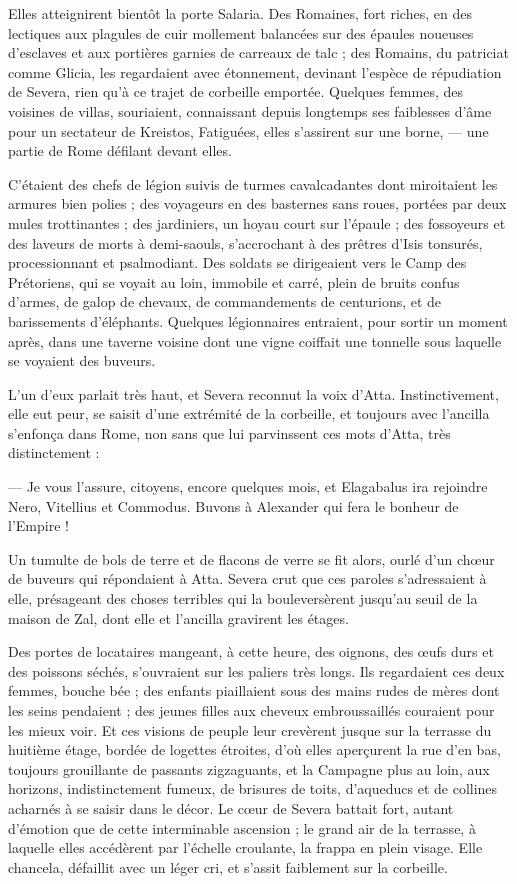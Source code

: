 \documentclass[a4paper, 11pt, oneside, polutonikogreek, french]{article}
\begin{document}
Elles atteignirent bientôt la porte Salaria. Des Romaines, fort riches, en des lectiques aux plagules de cuir mollement balancées sur des épaules noueuses d'esclaves et aux portières garnies de carreaux de talc ; des Romains, du patriciat comme Glicia, les regardaient avec étonnement, devinant l'espèce de répudiation de Severa, rien qu'à ce trajet de corbeille emportée. Quelques femmes, des voisines de villas, souriaient, connaissant depuis longtemps ses faiblesses d'âme pour un sectateur de Kreistos, Fatiguées, elles s'assirent sur une borne, --- une partie de Rome défilant devant elles.

C'étaient des chefs de légion suivis de turmes cavalcadantes dont miroitaient les armures bien polies ; des voyageurs en des basternes sans roues, portées par deux mules trottinantes ; des jardiniers, un hoyau court sur l'épaule ; des fossoyeurs et des laveurs de morts à demi-saouls, s'accrochant à des prêtres d'Isis tonsurés, processionnant et psalmodiant. Des soldats se dirigeaient vers le Camp des Prétoriens, qui se voyait au loin, immobile et carré, plein de bruits confus d'armes, de galop de chevaux, de commandements de centurions, et de barissements d'éléphants. Quelques légionnaires entraient, pour sortir un moment après, dans une taverne voisine dont une vigne coiffait une tonnelle sous laquelle se voyaient des buveurs.

L'un d'eux parlait très haut, et Severa reconnut la voix d'Atta. Instinctivement, elle eut peur, se saisit d'une extrémité de la corbeille, et toujours avec l'ancilla s'enfonça dans Rome, non sans que lui parvinssent ces mots d'Atta, très distinctement :

--- Je vous l'assure, citoyens, encore quelques mois, et Elagabalus ira rejoindre Nero, Vitellius et Commodus. Buvons à Alexander qui fera le bonheur de l'Empire !

Un tumulte de bols de terre et de flacons de verre se fit alors, ourlé d'un chœur de buveurs qui répondaient à Atta. Severa crut que ces paroles s'adressaient à elle, présageant des choses terribles qui la bouleversèrent jusqu'au seuil de la maison de Zal, dont elle et l'ancilla gravirent les étages.

Des portes de locataires mangeant, à cette heure, des oignons, des œufs durs et des poissons séchés, s'ouvraient sur les paliers très longs. Ils regardaient ces deux femmes, bouche bée ; des enfants piaillaient sous des mains rudes de mères dont les seins pendaient ; des jeunes filles aux cheveux embroussaillés couraient pour les mieux voir. Et ces visions de peuple leur crevèrent jusque sur la terrasse du huitième étage, bordée de logettes étroites, d'où elles aperçurent la rue d'en bas, toujours grouillante de passants zigzaguants, et la Campagne plus au loin, aux horizons, indistinctement fumeux, de brisures de toits, d'aqueducs et de collines acharnés à se saisir dans le décor. Le cœur de Severa battait fort, autant d'émotion que de cette interminable ascension ; le grand air de la terrasse, à laquelle elles accédèrent par l'échelle croulante, la frappa en plein visage. Elle chancela, défaillit avec un léger cri, et s'assit faiblement sur la corbeille.
\end{document}

